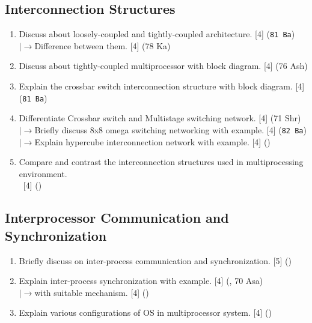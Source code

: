 \documentclass[12pt]{article}
\newcommand{\lb}{\\$\left|\rightarrow\right.$}
\newcommand{\enter}{\\\textcolor{white}{1}}
\begin{document}
	\subsection{Interconnection Structures}
		\begin{enumerate}
			\item Discuss about loosely-coupled and tightly-coupled architecture. \hfill [4] (\texttt{81 Ba})
			\lb Difference between them. \hfill [4] (78 Ka)

			\item Discuss about tightly-coupled multiprocessor with block diagram. \hfill [4] (76 Ash)

			\item Explain the crossbar switch interconnection structure with block diagram. \hfill [4] (\texttt{81 Ba})

			\item Differentiate Crossbar switch and Multistage switching network. \hfill [4] (71 Shr)
			\lb Briefly discuss 8x8 omega switching networking with example. \hfill [4] (\texttt{82 Ba})
			\lb Explain hypercube interconnection network with example. \hfill [4] ()

			\item Compare and contrast the interconnection structures used in multiprocessing environment.
			\enter\hfill [4] () 
		\end{enumerate}

	\subsection{Interprocessor Communication and Synchronization}
		\begin{enumerate}
			\item Briefly discuss on inter-process communication and synchronization. \hfill [5] ()

			\item Explain inter-process synchronization with example. \hfill [4] (, 70 Asa)
			\lb with suitable mechanism. \hfill [4] ()

			\item Explain various configurations of OS in multiprocessor system. \hfill [4] ()
		\end{enumerate}
\end{document}
